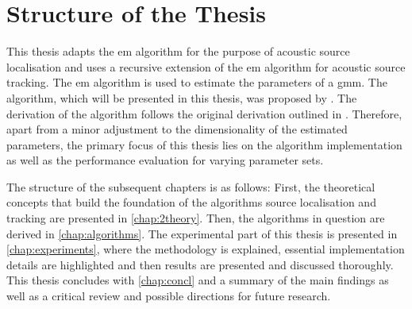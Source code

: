 \section{Structure of the Thesis}
\label{chap:1structure}

This thesis adapts the \gls{em} algorithm for the purpose of acoustic source localisation and uses a recursive extension of the \gls{em} algorithm for acoustic source tracking. The \gls{em} algorithm is used to estimate the parameters of a \gls{gmm}. The algorithm, which will be presented in this thesis, was proposed by \citeauthor{Schwartz2014} \cite{Schwartz2014}. The derivation of the algorithm follows the original derivation outlined in \cite{Schwartz2014}. Therefore, apart from a minor adjustment to the dimensionality of the estimated parameters, the primary focus of this thesis lies on the algorithm implementation as well as the performance evaluation for varying parameter sets.

The structure of the subsequent chapters is as follows: First, the theoretical concepts that build the foundation of the algorithms source localisation and tracking are presented in \autoref{chap:2theory}. Then, the algorithms in question are derived in \autoref{chap:algorithms}. The experimental part of this thesis is presented in \autoref{chap:experiments}, where the methodology is explained, essential implementation details are highlighted and then results are presented and discussed thoroughly. This thesis concludes with \autoref{chap:concl} and a summary of the main findings as well as a critical review and possible directions for future research.